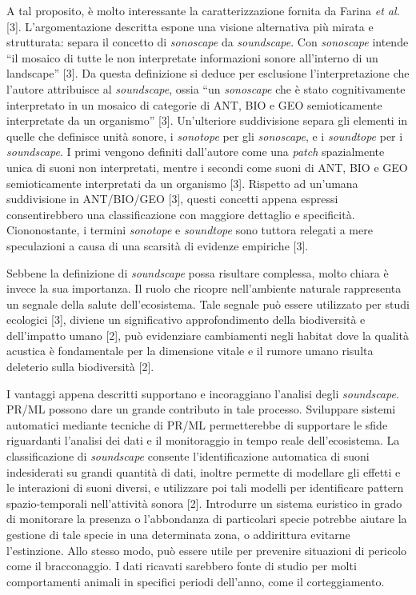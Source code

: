 A tal proposito, è molto interessante la caratterizzazione fornita da Farina \textit{et al. }[3].
L’argomentazione descritta espone una visione alternativa più mirata e strutturata: separa il
concetto di \textit{sonoscape} da \textit{soundscape}. Con \textit{sonoscape} intende “il mosaico di tutte le non
interpretate informazioni sonore all’interno di un landscape” [3]. Da questa definizione si
deduce per esclusione l’interpretazione che l’autore attribuisce al \textit{soundscape}, ossia “un
\textit{sonoscape} che è stato cognitivamente interpretato in un mosaico di categorie di ANT, BIO e
GEO semioticamente interpretate da un organismo” [3]. Un'ulteriore suddivisione separa gli
elementi in quelle che definisce unità sonore, i \textit{sonotope} per gli \textit{sonoscape}, e i \textit{soundtope} per i
\textit{soundscape}. I primi vengono definiti dall’autore come una \textit{patch} spazialmente unica di suoni
non interpretati, mentre i secondi come suoni di ANT, BIO e GEO semioticamente
interpretati da un organismo [3]. Rispetto ad un’umana suddivisione in ANT/BIO/GEO [3],
questi concetti appena espressi consentirebbero una classificazione con maggiore dettaglio e
specificità. Ciononostante, i termini \textit{sonotope} e \textit{soundtope} sono tuttora relegati a mere
speculazioni a causa di una scarsità di evidenze empiriche [3].

Sebbene la definizione di \textit{soundscape} possa risultare complessa, molto chiara è invece la sua
importanza. Il ruolo che ricopre nell’ambiente naturale rappresenta un segnale della salute
dell’ecosistema. Tale segnale può essere utilizzato per studi ecologici [3], diviene un
significativo approfondimento della biodiversità e dell’impatto umano [2], può evidenziare
cambiamenti negli habitat dove la qualità acustica è fondamentale per la dimensione vitale e
il rumore umano risulta deleterio sulla biodiversità [2].

I vantaggi appena descritti supportano e incoraggiano l’analisi degli \textit{soundscape}. PR/ML
possono dare un grande contributo in tale processo. Sviluppare sistemi automatici mediante
tecniche di PR/ML permetterebbe di supportare le sfide riguardanti l’analisi dei dati e il
monitoraggio in tempo reale dell’ecosistema. La classificazione di \textit{soundscape} consente
l’identificazione automatica di suoni indesiderati su grandi quantità di dati, inoltre permette
di modellare gli effetti e le interazioni di suoni diversi, e utilizzare poi tali modelli per
identificare pattern spazio-temporali nell’attività sonora [2]. Introdurre un sistema euristico in
grado di monitorare la presenza o l’abbondanza di particolari specie potrebbe aiutare la
gestione di tale specie in una determinata zona, o addirittura evitarne l’estinzione. Allo stesso
modo, può essere utile per prevenire situazioni di pericolo come il bracconaggio. I dati
ricavati sarebbero fonte di studio per molti comportamenti animali in specifici periodi
dell’anno, come il corteggiamento.

